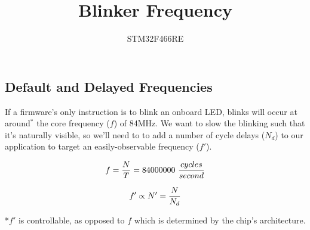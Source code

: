 \documentclass[a4paper,12pt]{article}   	%
\title{Blinker Frequency}
\author{STM32F466RE}
\begin{document}
\maketitle

\begin{flushleft}
\end{flushleft}

\subsection*{Default and Delayed Frequencies}
\large
If a firmware's only instruction is to blink an onboard LED,
blinks will occur at around$^*$ the core
frequency ($f$) of 84MHz. We want to slow the blinking 
such that it's naturally visible, so we'll need to to add a number of cycle delays 
($N_d$) to our application to target an easily-observable frequency ($f'$).

$$f = \frac{N}{T} = 84000000\ \frac{cycles}{second}\\[1 ex]$$

$$f' \propto N' = \frac{N}{N_{d}}\\[1 ex]$$
\large

\normalsize
*$f'$ is controllable, as opposed to $f$ which is determined by the chip's architecture.
\end{document}
